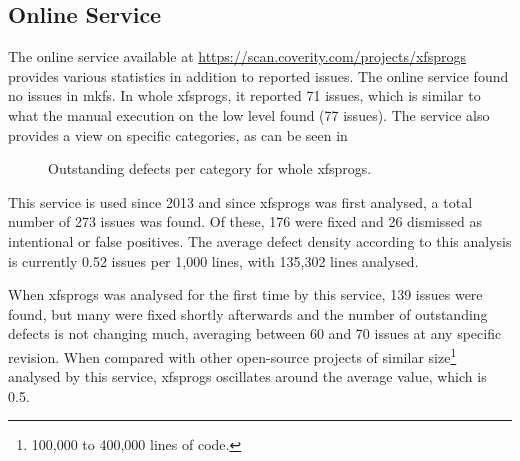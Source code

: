 \subsection{Online Service}\label{chap:results:coverity:online}

The online service available at
\url{https://scan.coverity.com/projects/xfsprogs} provides various statistics
in addition to reported issues. The online service found no issues in mkfs. In
whole xfsprogs, it reported 71 issues, which is similar to what the manual
execution on the low level found (77 issues). The service also provides a view on
specific categories, as can be seen in 

\begin{figure}
\caption{Outstanding defects per category for whole xfsprogs.}
\label{fig:results:coverity:defects}
\end{figure}

This service is used since 2013 and since xfsprogs was first analysed, a total
number of 273 issues was found. Of these, 176 were fixed and 26 dismissed as
intentional or false positives. The average defect density according to this
analysis is currently 0.52 issues per 1,000 lines, with 135,302 lines analysed.

When xfsprogs was analysed for the first time by this service, 139 issues were
found, but many were fixed shortly afterwards and the number of outstanding
defects is not changing much, averaging between 60 and 70 issues at any
specific revision. When compared with other open-source projects of similar
size\footnote{100,000 to 400,000 lines of code.} analysed by this service,
xfsprogs oscillates around the average value, which is 0.5.

